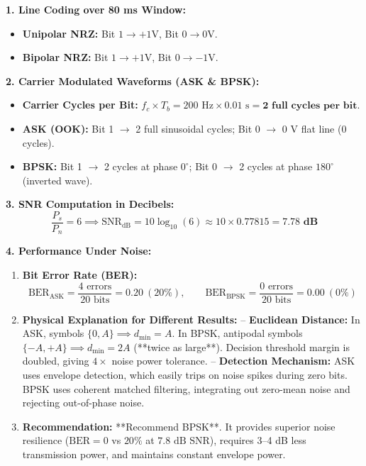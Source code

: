 \documentclass[10pt,a4paper]{article}
\begin{document}
\vspace{1pt}

\noindent\textbf{1. Line Coding over 80 ms Window:}
\begin{itemize}[leftmargin=12pt, itemsep=1pt]
    \item \textbf{Unipolar NRZ:} Bit $1 \to +1\text{V}$, Bit $0 \to 0\text{V}$.
    \item \textbf{Bipolar NRZ:} Bit $1 \to +1\text{V}$, Bit $0 \to -1\text{V}$.
\end{itemize}

\noindent\textbf{2. Carrier Modulated Waveforms (ASK \& BPSK):}
\begin{itemize}[leftmargin=12pt, itemsep=1pt]
    \item \textbf{Carrier Cycles per Bit:} $f_c \times T_b = 200\text{ Hz} \times 0.01\text{ s} = \mathbf{2\text{ full cycles per bit}}$.
    \item \textbf{ASK (OOK):} Bit 1 $\to$ 2 full sinusoidal cycles; Bit 0 $\to$ 0 V flat line (0 cycles).
    \item \textbf{BPSK:} Bit 1 $\to$ 2 cycles at phase $0^\circ$; Bit 0 $\to$ 2 cycles at phase $180^\circ$ (inverted wave).
\end{itemize}

\noindent\textbf{3. SNR Computation in Decibels:}
$$\frac{P_s}{P_n} = 6 \implies \text{SNR}_{\text{dB}} = 10 \log_{10}(6) \approx 10 \times 0.77815 = \mathbf{7.78\text{ dB}}$$

\noindent\textbf{4. Performance Under Noise:}
\begin{enumerate}[leftmargin=14pt, itemsep=1.5pt]
    \item \textbf{Bit Error Rate (BER):}
    $$\text{BER}_{\text{ASK}} = \frac{4\text{ errors}}{20\text{ bits}} = \mathbf{0.20}\ (20\%), \qquad \text{BER}_{\text{BPSK}} = \frac{0\text{ errors}}{20\text{ bits}} = \mathbf{0.00}\ (0\%)$$
    \item \textbf{Physical Explanation for Different Results:}
    -- \textbf{Euclidean Distance:} In ASK, symbols $\{0, A\} \implies d_{\min} = A$. In BPSK, antipodal symbols $\{-A, +A\} \implies d_{\min} = 2A$ (**twice as large**). Decision threshold margin is doubled, giving $4\times$ noise power tolerance.  
    -- \textbf{Detection Mechanism:} ASK uses envelope detection, which easily trips on noise spikes during zero bits. BPSK uses coherent matched filtering, integrating out zero-mean noise and rejecting out-of-phase noise.
    \item \textbf{Recommendation:} **Recommend BPSK**. It provides superior noise resilience ($\text{BER}=0$ vs $20\%$ at $7.8\text{ dB}$ SNR), requires 3--4 dB less transmission power, and maintains constant envelope power.
\end{enumerate}
\end{document}
